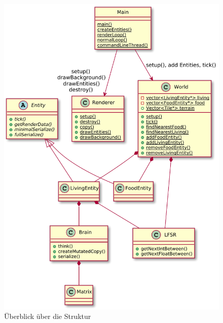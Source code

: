 \documentclass[course=erap]{aspdoc}
\begin{document}
\begin{figure}
    \centering
    \includegraphics[width=\textwidth]{res/overview.pdf}
    \caption{Überblick über die Struktur}
    \label{fig:class-overview}
\end{figure}
\end{document}
